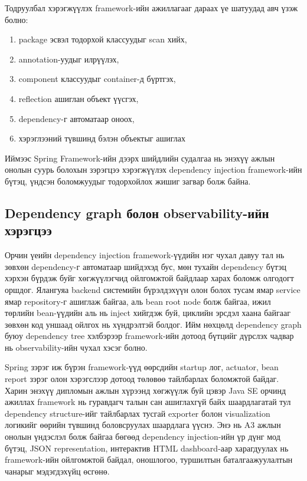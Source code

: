 Тодруулбал хэрэгжүүлэх framework-ийн ажиллагааг дараах үе шатуудад авч үзэж болно:
\begin{enumerate}
    \item package эсвэл тодорхой классуудыг scan хийх,
    \item annotation-уудыг илрүүлэх,
    \item component классуудыг container-д бүртгэх,
    \item reflection ашиглан объект үүсгэх,
    \item dependency-г автоматаар оноох,
    \item хэрэглээний түвшинд бэлэн объектыг ашиглах
\end{enumerate}

Иймээс Spring Framework-ийн дээрх шийдлийн судалгаа нь энэхүү ажлын онолын суурь болохын зэрэгцээ хэрэгжүүлэх dependency injection framework-ийн бүтэц, үндсэн боломжуудыг тодорхойлох жишиг загвар болж байна.

\subsection{Dependency graph болон observability-ийн хэрэгцээ}

Орчин үеийн dependency injection framework-үүдийн нэг чухал давуу тал нь зөвхөн dependency-г автоматаар шийдэхэд бус, мөн тухайн dependency бүтэц хэрхэн бүрдэж буйг хөгжүүлэгчид ойлгомжтой байдлаар харах боломж олгодогт оршдог. Ялангуяа backend системийн бүрэлдэхүүн олон болох тусам ямар service ямар repository-г ашиглаж байгаа, аль bean root node болж байгаа, ижил төрлийн bean-үүдийн аль нь inject хийгдэж буй, циклийн эрсдэл хаана байгааг зөвхөн код уншаад ойлгох нь хүндрэлтэй болдог. Ийм нөхцөлд dependency graph буюу dependency tree хэлбэрээр framework-ийн дотоод бүтцийг дүрслэх чадвар нь observability-ийн чухал хэсэг болно.

Spring зэрэг иж бүрэн framework-үүд өөрсдийн startup лог, actuator, bean report зэрэг олон хэрэгслээр дотоод төлөвөө тайлбарлах боломжтой байдаг. Харин энэхүү дипломын ажлын хүрээнд хөгжүүлж буй цэвэр Java SE орчинд ажиллах framework нь гуравдагч талын сан ашиглахгүй байх шаардлагатай тул dependency structure-ийг тайлбарлах тусгай exporter болон visualization логикийг өөрийн түвшинд боловсруулах шаардлага үүснэ. Энэ нь A3 ажлын онолын үндэслэл болж байгаа бөгөөд dependency injection-ийн үр дүнг мод бүтэц, JSON representation, интерактив HTML dashboard-аар харагдуулах нь framework-ийн ойлгомжтой байдал, оношлогоо, туршилтын баталгаажуулалтын чанарыг мэдэгдэхүйц өсгөнө.

